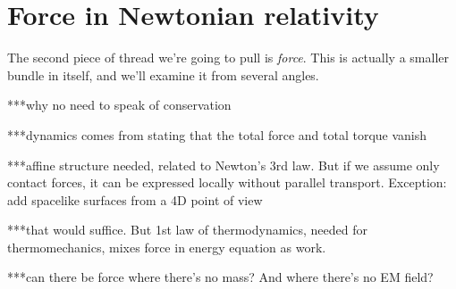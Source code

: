 \documentclass[\ifafour a4paper,12pt,\else a5paper,10pt,\fi%
onecolumn,oneside,article,%
british%
]{memoir}
\theoremstyle{remark}
\theoremstyle{innote}
\renewcommand*{\|}{\nonscript\,\vert\nonscript\;\mathopen{}}
\begin{document}

\section{Force in Newtonian relativity}
\label{sec:force}




The second piece of thread we're going to pull is \emph{force}. This is
actually a smaller bundle in itself, and we'll examine it from several angles.

***why no need to speak of conservation

***dynamics comes from stating that the total force and total torque vanish

***affine structure needed, related to Newton's 3rd law. But if we assume
only contact forces, it can be expressed locally without parallel
transport. Exception: add spacelike surfaces from a 4D point of view

***that would suffice. But 1st law of thermodynamics, needed for
thermomechanics, mixes force in energy equation as work.

***can there be force where there's no mass? And where there's no EM field?
\end{document}
